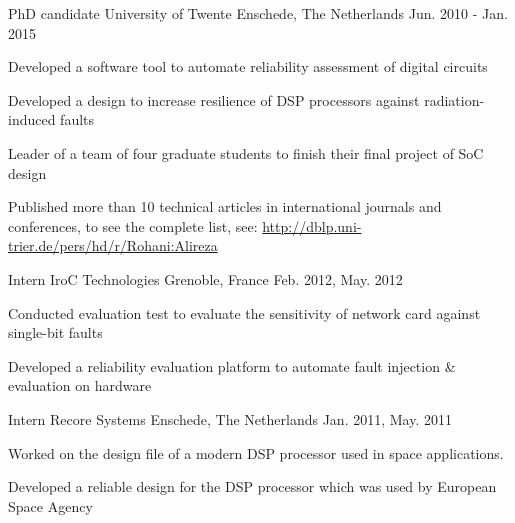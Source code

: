 \begin{cventries}
  \cventry
    {PhD candidate} %
    {University of Twente} %
    {Enschede, The Netherlands} %
    {Jun. 2010 - Jan. 2015} %
    {
      \begin{cvitems} %
	\item {Developed a software tool to automate reliability assessment of digital circuits}
        \item {Developed a design to increase resilience of DSP processors against radiation-induced faults}
        \item {Leader of a team of four graduate students to finish their final project of SoC design}
	\item{Published more than 10 technical articles in international journals and conferences, to see the complete list, see: \newline \href{www.dblp.uni-trier.de/pers/hd/r/Rohani:Alireza} {http://dblp.uni-trier.de/pers/hd/r/Rohani:Alireza}}
      \end{cvitems}
    }

  \cventry
    {Intern} %
    {IroC Technologies} %
    {Grenoble, France} %
    {Feb. 2012, May. 2012} %
    {
      \begin{cvitems} %
        \item {Conducted evaluation test to evaluate the sensitivity of network card against single-bit faults}
        \item {Developed a reliability evaluation platform to automate fault injection \&  evaluation on hardware}
	\end{cvitems}
	}

  \cventry
    {Intern} %
    {Recore Systems} %
    {Enschede, The Netherlands} %
    {Jan. 2011, May. 2011} %
    {
      \begin{cvitems} %
        \item {Worked on the design file of a modern DSP processor used in space applications.}
        \item {Developed a reliable design for the DSP processor which was used by European Space Agency}
      \end{cvitems}
    }

\end{cventries}

